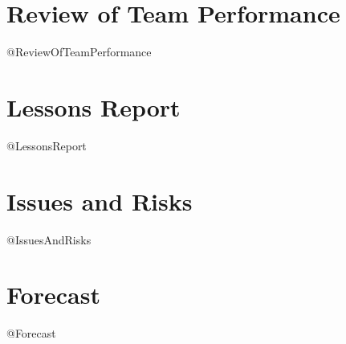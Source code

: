 \documentclass{report}
\begin{document}
\section{Review of Team Performance}
@ReviewOfTeamPerformance

\section{Lessons Report}
@LessonsReport

\section{Issues and Risks}
@IssuesAndRisks

\section{Forecast}
@Forecast
\end{document}
